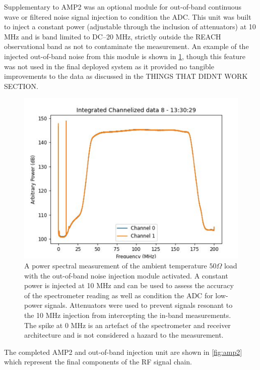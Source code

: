 Supplementary to AMP2 was an optional module for out-of-band continuous wave or filtered noise signal injection to condition the ADC. This unit was built to inject a constant power (adjustable through the inclusion of attenuators) at 10 MHz and is band limited to DC--20 MHz, strictly outside the REACH observational band as not to contaminate the measurement. An example of the injected out-of-band noise from this module is shown in \cref{fig:oob_cond}, though this feature was not used in the final deployed system as it provided no tangible improvements to the data as discussed in the THINGS THAT DIDNT WORK SECTION.
\begin{figure}
    \centering
    \includegraphics[scale=0.5]{oob_cond}
    \caption{A power spectral measurement of the ambient temperature $50 \Omega$ load with the out-of-band noise injection module activated. A constant power is injected at 10 MHz and can be used to assess the accuracy of the spectrometer reading as well as condition the ADC for low-power signals. Attenuators were used to prevent signals resonant to the 10 MHz injection from intercepting the in-band measurements. The spike at 0 MHz is an artefact of the spectrometer and receiver architecture and is not considered a hazard to the measurement.}
    \label{fig:oob_cond}
\end{figure}
The completed AMP2 and out-of-band injection unit are shown in \cref{fig:amp2} which represent the final components of the RF signal chain.
